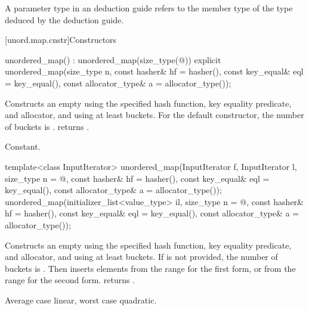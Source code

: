\pnum
A  parameter type in an  deduction guide
refers to the  member type of the type deduced by the deduction guide.

[unord.map.cnstr]{Constructors}

%
\begin{itemdecl}
unordered_map() : unordered_map(size_type(@\seebelow@)) { }
explicit unordered_map(size_type n,
                       const hasher& hf = hasher(),
                       const key_equal& eql = key_equal(),
                       const allocator_type& a = allocator_type());
\end{itemdecl}

\begin{itemdescr}
\pnum
\effects
Constructs an empty  using the
specified hash function, key equality predicate, and allocator, and
using at least  buckets.  For the default constructor,
the number of buckets is .
 returns .

\pnum
\complexity
Constant.
\end{itemdescr}

%
\begin{itemdecl}
template<class InputIterator>
  unordered_map(InputIterator f, InputIterator l,
                size_type n = @\seebelow@,
                const hasher& hf = hasher(),
                const key_equal& eql = key_equal(),
                const allocator_type& a = allocator_type());
unordered_map(initializer_list<value_type> il,
              size_type n = @\seebelow@,
              const hasher& hf = hasher(),
              const key_equal& eql = key_equal(),
              const allocator_type& a = allocator_type());
\end{itemdecl}

\begin{itemdescr}
\pnum
\effects
Constructs an empty  using the
specified hash function, key equality predicate, and allocator, and
using at least  buckets. If  is not
provided, the number of buckets is . Then
inserts elements from the range 
for the first form, or from the range
 for the second form.
 returns .

\pnum
\complexity
Average case linear, worst case quadratic.
\end{itemdescr}

